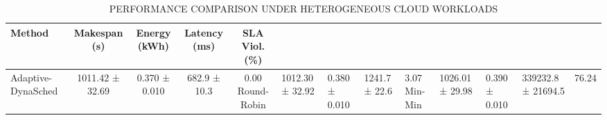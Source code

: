 \begin{table}[t]
\caption{\textsc{PERFORMANCE COMPARISON UNDER HETEROGENEOUS CLOUD WORKLOADS}}
\label{tab:results_1}
\centering
\begin{tabular}{lcccc}
\hline
\textbf{Method} & \textbf{Makespan (s)} & \textbf{Energy (kWh)} & \textbf{Latency (ms)} & \textbf{SLA Viol. (\%)} \\
\hline
Adaptive-DynaSched & 1011.42 ± 32.69 & 0.370 ± 0.010 & 682.9 ± 10.3 & 0.00%
Round-Robin & 1012.30 ± 32.92 & 0.380 ± 0.010 & 1241.7 ± 22.6 & 3.07%
Min-Min & 1026.01 ± 29.98 & 0.390 ± 0.010 & 339232.8 ± 21694.5 & 76.24%
\hline
\end{tabular}
\end{table}
